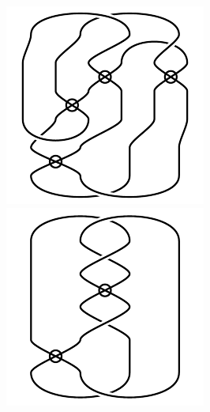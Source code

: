 \begin{figure}[H]
\begin{minipage}[b]{.18\linewidth}
\end{minipage}
\begin{minipage}[b]{.18\linewidth}
\centering
\includegraphics[width=\linewidth]{../data/virtual_4_24.png}
\end{minipage}
\begin{minipage}[b]{.18\linewidth}
\centering
\includegraphics[width=\linewidth]{../data/virtual_4_25.png}

\end{minipage}
\end{figure}

